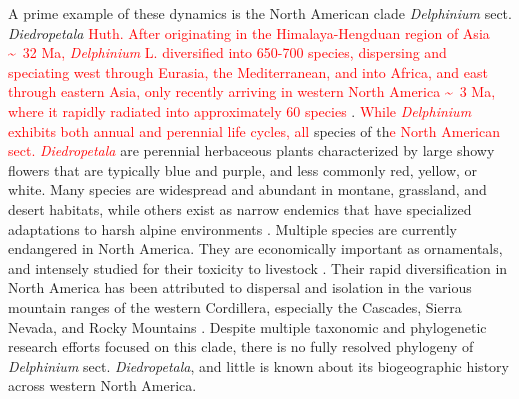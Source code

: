 \documentclass[11pt]{article}
\begin{document}


A prime example of these dynamics is the North American clade  \emph{Delphinium} 
sect. \emph{Diedropetala} \textcolor{red}{Huth. After originating in the Himalaya-Hengduan region of Asia \textasciitilde~32 Ma, \emph{Delphinium} L. diversified into 650-700 species,
dispersing and speciating west through Eurasia, the Mediterranean, and into Africa, and east through eastern Asia, 
only recently
arriving in western North America \textasciitilde~3 Ma, where it rapidly radiated 
into approximately 60 species} \citep{jabbour_phylogeny_2012}.
% 
\textcolor{red}{While \emph{Delphinium} exhibits both annual and perennial life cycles, all} species of th\textcolor{red}{e North American sect. \emph{Diedropetala}} are perennial herbaceous plants characterized by large 
showy flowers that are typically blue and purple, and less commonly red, yellow, 
or white. 
% 
Many species are widespread and abundant in montane, grassland, and desert habitats,
while others exist as narrow endemics that have specialized adaptations to harsh 
alpine environments \citep{warnock_taxonomic_1995}. 
% 
Multiple species are currently endangered in North America. 
They are economically important as ornamentals, and intensely studied for 
their toxicity to livestock \citep{cook_biogeographical_2009, 
cook_two_2017, gardner_taxonomic_2002, pfister_grazing_2014}.
Their rapid diversification in North America has been attributed to dispersal and 
isolation in the various mountain ranges of the western Cordillera, especially the
Cascades, Sierra Nevada, and Rocky Mountains \citep{warnock_taxonomic_1995}.
% 
Despite multiple taxonomic and phylogenetic research efforts focused on this clade,
there is no fully resolved phylogeny of \emph{Delphinium} sect. \emph{Diedropetala},
and little is known about its biogeographic history across western North America.
\end{document}
